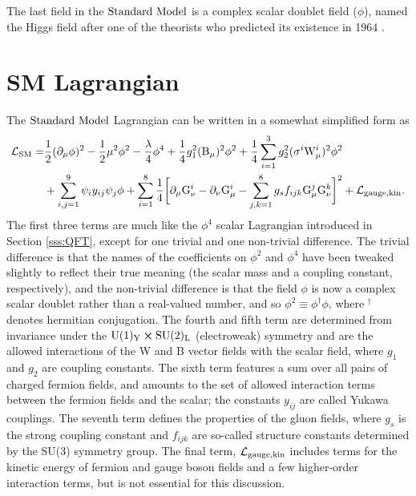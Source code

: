 The last field in the $\text{Standard\ Model}$ is a complex scalar doublet field ($\phi$), named the Higgs field after one of the theorists who predicted its existence in 1964 \cite{Higgs:1964pj}. 

\section{SM Lagrangian}
The $\text{Standard\ Model}$ Lagrangian \cite{Langacker:1995hi} can be written in a somewhat simplified form as
\begin{align}
\begin{split}
\mathcal{L}_{\rm SM} =& \frac{1}{2}(\partial_\mu \phi)^2 
- \frac{1}{2}\mu^2\phi^{2}
-\frac{\lambda}{4}\phi^{4}
+\frac{1}{4}g_{1}^{2}({\rm B}_{\mu})^2\phi^2 + \frac{1}{4}\sum_{i=1}^{3}g_{2}^2 (\sigma^{i} {\rm W}^{i}_{\mu})^2\phi^2 \\
&+ \sum_{i,j=1}^{9}\psi_i y_{ij} \psi_{j}\phi
+\sum_{i=1}^{8}\frac{1}{4}\bigg[\partial_\mu {\rm G}^{i}_\nu - \partial_\nu {\rm G}^{i}_\mu - \sum_{j,k=1}^{8}g_s f_{ijk} {\rm G}^{j}_{\mu}{\rm G}^{k}_{\nu}\bigg]^2
+\mathcal{L}_{\rm gauge, kin}.
\end{split}
\end{align}
The first three terms are much like the $\phi^4$ scalar Lagrangian introduced in Section \ref{sss:QFT}, except for one trivial and one non-trivial difference. The trivial difference is that the names of the coefficients on $\phi^2$ and $\phi^4$ have been tweaked slightly to reflect their true meaning (the scalar mass and a coupling constant, respectively), and the non-trivial difference is that the field $\phi$ is now a complex scalar doublet rather than a real-valued number, and so $\phi^2\equiv\phi^{\dag}\phi$, where $^\dag$ denotes hermitian conjugation. The fourth and fifth term are determined from invariance under the $\rm U(1)_{Y}\cross\rm SU(2)_{L}$ (electroweak) symmetry and are the allowed interactions of the W and B vector fields with the scalar field, where $g_{1}$ and $g_{2}$ are coupling constants. The sixth term features a sum over all pairs of charged fermion fields, and amounts to the set of allowed interaction terms between the fermion fields and the scalar; the constants $y_{ij}$ are called Yukawa couplings. The seventh term defines the properties of the gluon fields, where $g_s$ is the strong coupling constant and $f_{ijk}$ are so-called structure constants determined by the SU(3) symmetry group. The final term, $\mathcal{L}_{\rm gauge, kin}$ includes terms for the kinetic energy of fermion and gauge boson fields and a few higher-order interaction terms, but is not essential for this discussion.

